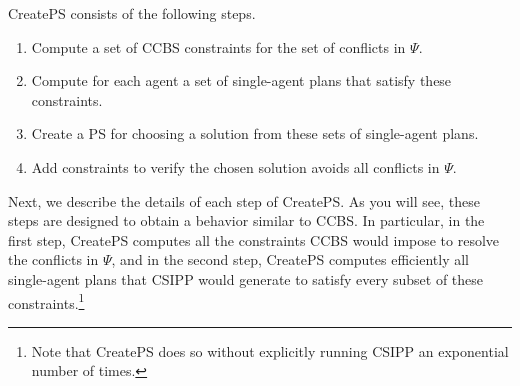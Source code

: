 \documentclass[review]{elsarticle}
\newcommand{\mddr}{\ensuremath{MDD_R}\xspace}
\newcommand\konstantin[1]{\nb{\textbf{Konstantin:}}{red}{#1}}
\newcommand\roni[1]{\nb{\textbf{Roni:}}{green}{#1}}
\newcommand{\ccbs}{\ac{CCBS}\xspace}
\newcommand{\csipp}{\ac{CSIPP}\xspace}
\newcommand{\ps}{\ac{PS}\xspace}
\begin{document}
\noindent CreatePS consists of the following steps. 
\begin{enumerate}
	\item Compute a set of \ccbs constraints for the set of conflicts in $\Psi$. 
	\item Compute for each agent a set of single-agent plans that satisfy these constraints. %
	\item Create a \ps for choosing a solution from these sets of single-agent plans. %
	\item Add constraints to verify the chosen solution avoids all conflicts in $\Psi$. %
\end{enumerate}
Next, we describe the details of each step of CreatePS. 
As you will see, these steps are designed to obtain a behavior similar to \ccbs. 
In particular, in the first step, CreatePS computes all the constraints \ccbs would impose to resolve the conflicts in $\Psi$, 
and in the second step, CreatePS computes efficiently all single-agent plans that \csipp would generate to satisfy every subset of these constraints.\footnote{Note that CreatePS does so without explicitly running \csipp an exponential number of times.}
\end{document}
